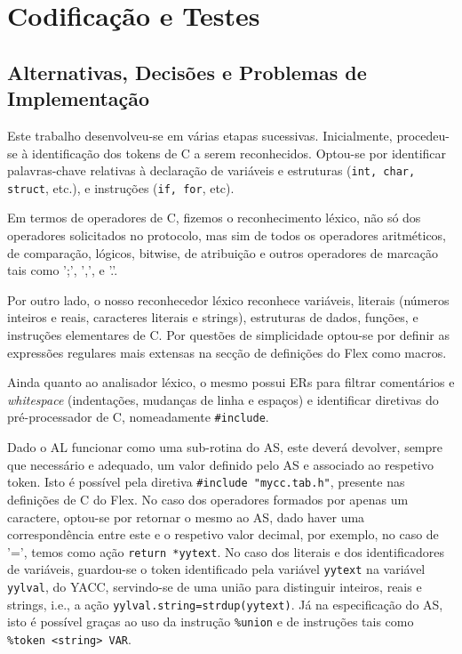 \documentclass{report}
\begin{document}
\chapter{Codificação e Testes}

\section{Alternativas, Decisões e Problemas de Implementação}

Este trabalho desenvolveu-se em várias etapas sucessivas. Inicialmente, procedeu-se à identificação dos tokens de C a serem reconhecidos. Optou-se por identificar palavras-chave relativas à declaração de variáveis e estruturas (\texttt{int, char, struct}, etc.), e instruções (\texttt{if, for}, etc).

Em termos   de operadores de C, fizemos o reconhecimento léxico, não só dos operadores solicitados no protocolo, mas sim de todos os operadores aritméticos, de comparação, lógicos,  bitwise, de atribuição e outros operadores de marcação tais como ';', ',', e '.'.

Por outro lado, o nosso reconhecedor léxico reconhece variáveis, literais (números inteiros e reais, caracteres literais e strings), estruturas de dados, funções, e instruções elementares de C. Por questões de simplicidade optou-se por definir as expressões regulares mais extensas na secção de definições do Flex como macros.

Ainda quanto ao analisador léxico, o mesmo possui ERs para filtrar comentários e \textit{whitespace} (indentações, mudanças de linha e espaços) e identificar diretivas do pré-processador de C, nomeadamente \texttt{\#include}.

Dado o AL funcionar como uma sub-rotina do AS, este deverá devolver, sempre que necessário e adequado, um valor definido pelo AS e associado ao respetivo token. Isto é possível pela diretiva \texttt{\#include "mycc.tab.h"}, presente nas definições de C do Flex.
No caso dos operadores formados por apenas um caractere, optou-se por retornar o mesmo ao AS, dado haver uma correspondência entre este e o respetivo valor decimal, por exemplo, no caso de '=', temos como ação \texttt{return *yytext}. No caso dos literais e dos identificadores de variáveis, guardou-se o token identificado pela variável \texttt{yytext} na variável \texttt{yylval}, do YACC, servindo-se de uma união para distinguir inteiros, reais e strings, i.e., a ação \texttt{yylval.string=strdup(yytext)}.
Já na especificação do AS, isto é possível graças ao uso da instrução \texttt{\%union} e de instruções tais como \texttt{\%token <string> VAR}.
\end{document}

